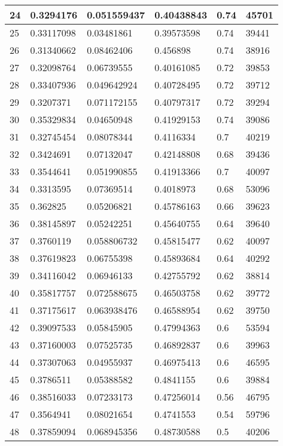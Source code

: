 \begin{longtable}{|l|l|l|l|l|l|}
24 & 0.3294176 & 0.051559437 & 0.40438843 & 0.74 & 45701 \\ \hline 
25 & 0.33117098 & 0.03481861 & 0.39573598 & 0.74 & 39441 \\ \hline 
26 & 0.31340662 & 0.08462406 & 0.456898 & 0.74 & 38916 \\ \hline 
27 & 0.32098764 & 0.06739555 & 0.40161085 & 0.72 & 39853 \\ \hline 
28 & 0.33407936 & 0.049642924 & 0.40728495 & 0.72 & 39712 \\ \hline 
29 & 0.3207371 & 0.071172155 & 0.40797317 & 0.72 & 39294 \\ \hline 
30 & 0.35329834 & 0.04650948 & 0.41929153 & 0.74 & 39086 \\ \hline 
31 & 0.32745454 & 0.08078344 & 0.4116334 & 0.7 & 40219 \\ \hline 
32 & 0.3424691 & 0.07132047 & 0.42148808 & 0.68 & 39436 \\ \hline 
33 & 0.3544641 & 0.051990855 & 0.41913366 & 0.7 & 40097 \\ \hline 
34 & 0.3313595 & 0.07369514 & 0.4018973 & 0.68 & 53096 \\ \hline 
35 & 0.362825 & 0.05206821 & 0.45786163 & 0.66 & 39623 \\ \hline 
36 & 0.38145897 & 0.05242251 & 0.45640755 & 0.64 & 39640 \\ \hline 
37 & 0.3760119 & 0.058806732 & 0.45815477 & 0.62 & 40097 \\ \hline 
38 & 0.37619823 & 0.06755398 & 0.45893684 & 0.64 & 40292 \\ \hline 
39 & 0.34116042 & 0.06946133 & 0.42755792 & 0.62 & 38814 \\ \hline 
40 & 0.35817757 & 0.072588675 & 0.46503758 & 0.62 & 39772 \\ \hline 
41 & 0.37175617 & 0.063938476 & 0.46588954 & 0.62 & 39750 \\ \hline 
42 & 0.39097533 & 0.05845905 & 0.47994363 & 0.6 & 53594 \\ \hline 
43 & 0.37160003 & 0.07525735 & 0.46892837 & 0.6 & 39963 \\ \hline 
44 & 0.37307063 & 0.04955937 & 0.46975413 & 0.6 & 46595 \\ \hline 
45 & 0.3786511 & 0.05388582 & 0.4841155 & 0.6 & 39884 \\ \hline 
46 & 0.38516033 & 0.07233173 & 0.47256014 & 0.56 & 46795 \\ \hline 
47 & 0.3564941 & 0.08021654 & 0.4741553 & 0.54 & 59796 \\ \hline 
48 & 0.37859094 & 0.068945356 & 0.48730588 & 0.5 & 40206 \\ \hline 

\end{longtable}
